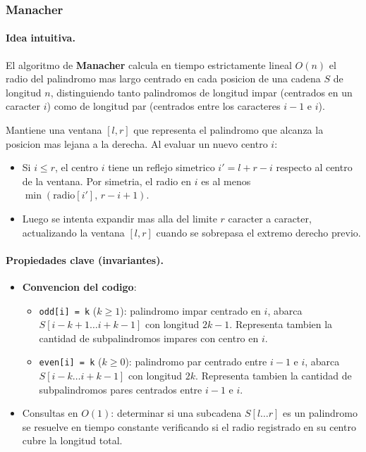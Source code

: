 \subsubsection{Manacher}

\paragraph{Idea intuitiva.}
El algoritmo de \textbf{Manacher} calcula en tiempo estrictamente lineal $O(n)$ el radio del palindromo mas largo centrado en cada posicion de una cadena $S$ de longitud $n$, distinguiendo tanto palindromos de longitud impar (centrados en un caracter $i$) como de longitud par (centrados entre los caracteres $i-1$ e $i$).

Mantiene una ventana $[l, r]$ que representa el palindromo que alcanza la posicion mas lejana a la derecha. Al evaluar un nuevo centro $i$:
\begin{itemize}\setlength\itemsep{0pt}
	\item Si $i \le r$, el centro $i$ tiene un reflejo simetrico $i' = l + r - i$ respecto al centro de la ventana. Por simetria, el radio en $i$ es al menos $\min(\text{radio}[i'], \, r - i + 1)$.
	\item Luego se intenta expandir mas alla del limite $r$ caracter a caracter, actualizando la ventana $[l, r]$ cuando se sobrepasa el extremo derecho previo.
\end{itemize}

\paragraph{Propiedades clave (invariantes).}
\begin{itemize}\setlength\itemsep{0pt}
	\item \textbf{Convencion del codigo}:
	\begin{itemize}\setlength\itemsep{0pt}
		\item \texttt{odd[i] = k} ($k \ge 1$): palindromo impar centrado en $i$, abarca $S[i - k + 1 \dots i + k - 1]$ con longitud $2k - 1$. Representa tambien la cantidad de subpalindromos impares con centro en $i$.
		\item \texttt{even[i] = k} ($k \ge 0$): palindromo par centrado entre $i-1$ e $i$, abarca $S[i - k \dots i + k - 1]$ con longitud $2k$. Representa tambien la cantidad de subpalindromos pares centrados entre $i-1$ e $i$.
	\end{itemize}
	\item Consultas en $O(1)$: determinar si una subcadena $S[l \dots r]$ es un palindromo se resuelve en tiempo constante verificando si el radio registrado en su centro cubre la longitud total.
\end{itemize}

